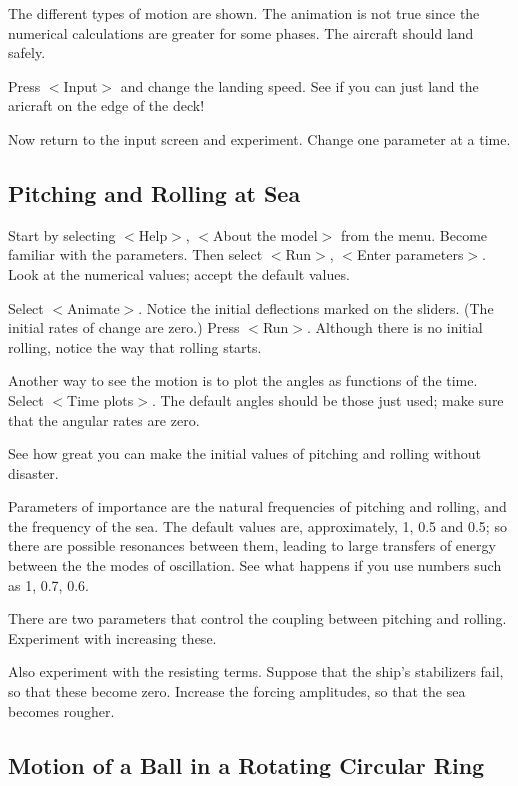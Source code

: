    The different types of motion are shown. The animation is not true
since the numerical calculations are greater for some phases. The
aircraft should land safely.

   Press $<$Input$>$ and change the landing speed. See if you can just land
the aricraft on the edge of the deck!

   Now return to the input screen and experiment. Change one parameter
at a time.


\subsection{Pitching and Rolling at Sea}

   Start by selecting $<$Help$>$, $<$About the model$>$ from the menu.
Become familiar with the parameters. Then select $<$Run$>$, $<$Enter
parameters$>$. Look at the numerical values; accept the default values.

   Select $<$Animate$>$. Notice the initial deflections marked on the
sliders. (The initial rates of change are zero.) Press $<$Run$>$.
Although there is no initial rolling, notice the way that rolling starts.

Another way to see the motion is to plot the angles as functions of
the time. Select $<$Time plots$>$. The default angles should be those just
used; make sure that the angular rates are zero.

   See how great you can make the initial values of pitching and
rolling without disaster.

   Parameters of importance are the natural frequencies of pitching
and rolling, and the frequency of the sea. The default values are,
approximately, 1, 0.5 and 0.5; so there are possible resonances
between them, leading to large transfers of energy between the the
modes of oscillation. See what happens if you use numbers such as
1, 0.7, 0.6.

   There are two parameters that control the coupling between pitching
and rolling. Experiment with increasing these.

   Also experiment with the resisting terms. Suppose that the ship's
stabilizers fail, so that these become zero. Increase the forcing
amplitudes, so that the sea becomes rougher.



\subsection{Motion of a Ball in a Rotating Circular Ring}

